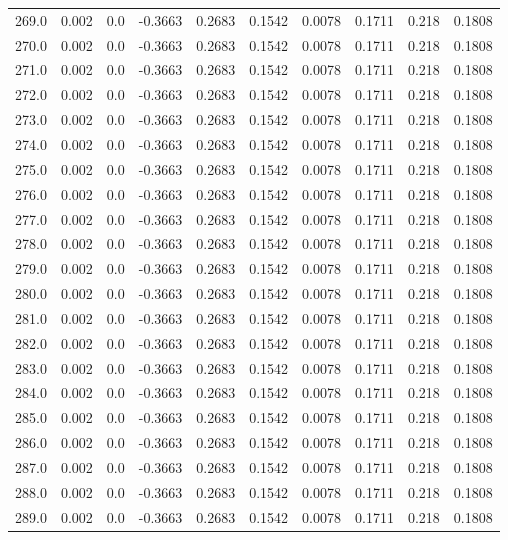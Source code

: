 \begin{longtable}{lrrrrrrrrr}
269.0 & 0.002 & 0.0 & -0.3663 & 0.2683 & 0.1542 & 0.0078 & 0.1711 & 0.218 & 0.1808 \\
270.0 & 0.002 & 0.0 & -0.3663 & 0.2683 & 0.1542 & 0.0078 & 0.1711 & 0.218 & 0.1808 \\
271.0 & 0.002 & 0.0 & -0.3663 & 0.2683 & 0.1542 & 0.0078 & 0.1711 & 0.218 & 0.1808 \\
272.0 & 0.002 & 0.0 & -0.3663 & 0.2683 & 0.1542 & 0.0078 & 0.1711 & 0.218 & 0.1808 \\
273.0 & 0.002 & 0.0 & -0.3663 & 0.2683 & 0.1542 & 0.0078 & 0.1711 & 0.218 & 0.1808 \\
274.0 & 0.002 & 0.0 & -0.3663 & 0.2683 & 0.1542 & 0.0078 & 0.1711 & 0.218 & 0.1808 \\
275.0 & 0.002 & 0.0 & -0.3663 & 0.2683 & 0.1542 & 0.0078 & 0.1711 & 0.218 & 0.1808 \\
276.0 & 0.002 & 0.0 & -0.3663 & 0.2683 & 0.1542 & 0.0078 & 0.1711 & 0.218 & 0.1808 \\
277.0 & 0.002 & 0.0 & -0.3663 & 0.2683 & 0.1542 & 0.0078 & 0.1711 & 0.218 & 0.1808 \\
278.0 & 0.002 & 0.0 & -0.3663 & 0.2683 & 0.1542 & 0.0078 & 0.1711 & 0.218 & 0.1808 \\
279.0 & 0.002 & 0.0 & -0.3663 & 0.2683 & 0.1542 & 0.0078 & 0.1711 & 0.218 & 0.1808 \\
280.0 & 0.002 & 0.0 & -0.3663 & 0.2683 & 0.1542 & 0.0078 & 0.1711 & 0.218 & 0.1808 \\
281.0 & 0.002 & 0.0 & -0.3663 & 0.2683 & 0.1542 & 0.0078 & 0.1711 & 0.218 & 0.1808 \\
282.0 & 0.002 & 0.0 & -0.3663 & 0.2683 & 0.1542 & 0.0078 & 0.1711 & 0.218 & 0.1808 \\
283.0 & 0.002 & 0.0 & -0.3663 & 0.2683 & 0.1542 & 0.0078 & 0.1711 & 0.218 & 0.1808 \\
284.0 & 0.002 & 0.0 & -0.3663 & 0.2683 & 0.1542 & 0.0078 & 0.1711 & 0.218 & 0.1808 \\
285.0 & 0.002 & 0.0 & -0.3663 & 0.2683 & 0.1542 & 0.0078 & 0.1711 & 0.218 & 0.1808 \\
286.0 & 0.002 & 0.0 & -0.3663 & 0.2683 & 0.1542 & 0.0078 & 0.1711 & 0.218 & 0.1808 \\
287.0 & 0.002 & 0.0 & -0.3663 & 0.2683 & 0.1542 & 0.0078 & 0.1711 & 0.218 & 0.1808 \\
288.0 & 0.002 & 0.0 & -0.3663 & 0.2683 & 0.1542 & 0.0078 & 0.1711 & 0.218 & 0.1808 \\
289.0 & 0.002 & 0.0 & -0.3663 & 0.2683 & 0.1542 & 0.0078 & 0.1711 & 0.218 & 0.1808 \\

\end{longtable}
